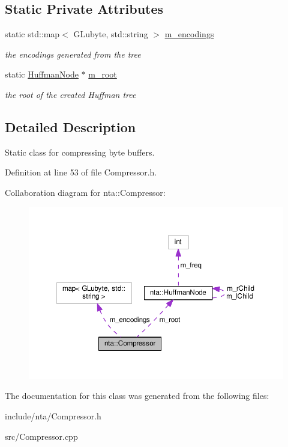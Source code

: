 \subsection*{Static Private Attributes}
\begin{DoxyCompactItemize}
\item 
\mbox{\label{classnta_1_1Compressor_a85e378612ff069d0bc915c87fae74e7d}} 
static std\+::map$<$ G\+Lubyte, std\+::string $>$ \hyperlink{classnta_1_1Compressor_a85e378612ff069d0bc915c87fae74e7d}{m\+\_\+encodings}
\begin{DoxyCompactList}\small\item\em the encodings generated from the tree \end{DoxyCompactList}\item 
\mbox{\label{classnta_1_1Compressor_a9cec9a631892c8cd4b9c2358c7ac41f4}} 
static \hyperlink{classnta_1_1HuffmanNode}{Huffman\+Node} $\ast$ \hyperlink{classnta_1_1Compressor_a9cec9a631892c8cd4b9c2358c7ac41f4}{m\+\_\+root}
\begin{DoxyCompactList}\small\item\em the root of the created Huffman tree \end{DoxyCompactList}\end{DoxyCompactItemize}


\subsection{Detailed Description}
Static class for compressing byte buffers. 

Definition at line 53 of file Compressor.\+h.



Collaboration diagram for nta\+:\+:Compressor\+:\nopagebreak
\begin{figure}[H]
\begin{center}
\leavevmode
\includegraphics[width=350pt]{d6/deb/classnta_1_1Compressor__coll__graph}
\end{center}
\end{figure}


The documentation for this class was generated from the following files\+:\begin{DoxyCompactItemize}
\item 
include/nta/Compressor.\+h\item 
src/Compressor.\+cpp\end{DoxyCompactItemize}
